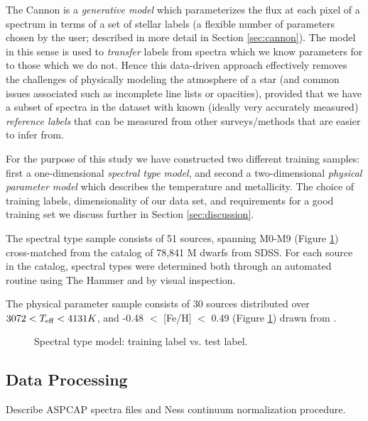 \documentclass[modern]{aastex62}
\begin{document}
The Cannon is a \emph{generative model} which parameterizes the flux at each pixel of a spectrum in terms of a set of stellar labels (a flexible number of parameters chosen by the user; described in more detail in Section \ref{sec:cannon}). The model in this sense is used to \emph{transfer} labels from spectra which we know parameters for to those which we do not. Hence this data-driven approach effectively removes the challenges of physically modeling the atmosphere of a star (and common issues associated such as incomplete line lists or opacities), provided that we have a subset of spectra in the dataset with known (ideally very accurately measured) \emph{reference labels} that can be measured from other surveys/methods that are easier to infer from. 

For the purpose of this study we have constructed two different training samples: first a one-dimensional \emph{spectral type model}, and second a two-dimensional \emph{physical parameter model} which describes the temperature and metallicity. The choice of training labels, dimensionality of our data set, and requirements for a good training set we discuss further in Section \ref{sec:discussion}.

The spectral type sample consists of 51 sources, spanning M0-M9 (Figure \ref{fig:train_dist}) cross-matched from the \citealt{West:2011} catalog of 78,841 M dwarfs from SDSS. For each source in the catalog, spectral types were determined both through an automated routine using The Hammer \citep{Covey:2007} and by visual inspection.

The physical parameter sample consists of 30 sources distributed over $3072 < T_{\rm eff} < 4131K$, and -0.48 $<$ [Fe/H] $<$ 0.49 (Figure \ref{fig:train_dist}) drawn from \citealt{Mann:2015}.
\color{red}{why logg not included as atmospheric parameter?}\color{black}

\begin{figure}[ht]
\caption{Spectral type model: training label vs. test label.} \label{fig:west_selftest} \label{fig:train_dist}
\end{figure}

\subsection{Data Processing}
Describe ASPCAP spectra files and Ness continuum normalization procedure.


\end{document}
